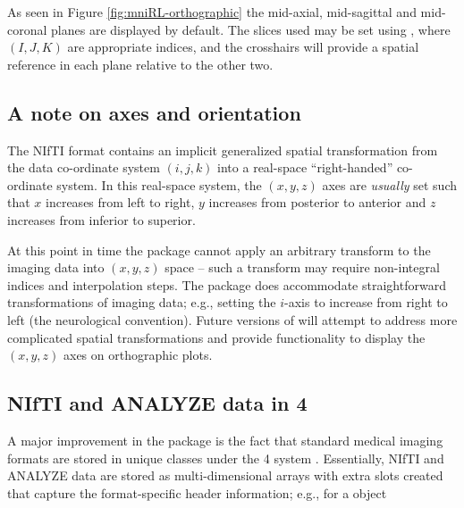 \documentclass[
]{article}
\begin{document}
As seen in Figure \ref{fig:mniRL-orthographic} the mid-axial,
mid-sagittal and mid-coronal planes are displayed by default. The slices
used may be set using , where \((I,J,K)\) are
appropriate indices, and the crosshairs will provide a spatial reference
in each plane relative to the other two.

\subsection{A note on axes and orientation}

The NIfTI format contains an implicit generalized spatial transformation
from the data co-ordinate system \((i,j,k)\) into a real-space
``right-handed'' co-ordinate system. In this real-space system, the
\((x,y,z)\) axes are \emph{usually} set such that \(x\) increases from
left to right, \(y\) increases from posterior to anterior and \(z\)
increases from inferior to superior.

At this point in time the  package cannot apply an
arbitrary transform to the imaging data into \((x,y,z)\) space -- such a
transform may require non-integral indices and interpolation steps. The
package does accommodate straightforward transformations of imaging
data; e.g., setting the \(i\)-axis to increase from right to left (the
neurological convention). Future versions of  will
attempt to address more complicated spatial transformations and provide
functionality to display the \((x,y,z)\) axes on orthographic plots.

\subsection[NIfTI and ANALYZE data in S4]{NIfTI and ANALYZE data in 4}

A major improvement in the  package is the fact that
standard medical imaging formats are stored in unique classes under the
4 system \citep{chambers:2008}. Essentially, NIfTI and
ANALYZE data are stored as multi-dimensional arrays with extra slots
created that capture the format-specific header information; e.g., for a
 object
\end{document}
